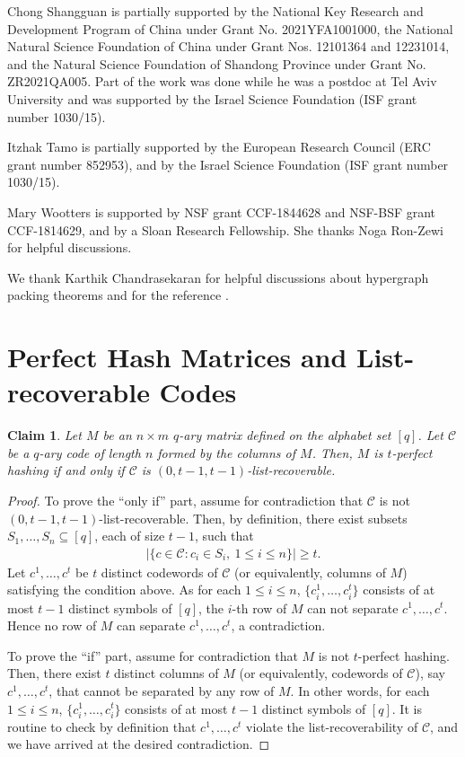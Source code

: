 \documentclass[11pt]{article}
\newtheorem{claim}[theorem]{Claim}
\newcommand\black[1]{{\color{black} #1}}
\newcommand{\ryl}[1]{{\color{red} {\small [Ray: #1]}}}
\begin{document}
Chong Shangguan is partially supported by the National Key Research and Development Program of China under Grant No. 2021YFA1001000,
the National Natural Science Foundation of China under Grant Nos. 12101364 and 12231014, and the Natural Science Foundation of Shandong Province under Grant
No. ZR2021QA005. Part of the work was done while he was a postdoc at Tel Aviv University and was supported by the Israel Science Foundation (ISF grant number 1030/15).

Itzhak Tamo is partially supported by the European Research Council (ERC grant number 852953), and by the Israel Science Foundation (ISF grant number 1030/15).

Mary Wootters is supported by NSF grant CCF-1844628 and  NSF-BSF grant CCF-1814629, and by a Sloan Research Fellowship.  She thanks Noga Ron-Zewi for helpful discussions.

We thank Karthik Chandrasekaran for helpful discussions about hypergraph packing theorems and for the reference \cite{CCV09}.



\newpage
\appendix

\black{\section{Perfect Hash Matrices and List-recoverable Codes}}

\black{\begin{claim}\label{app:matrices-codes}
    Let $M$ be an $n\times m$ $q$-ary matrix defined on the alphabet set $[q]$. Let $\mathcal{C}$ be a $q$-ary code of length $n$ formed by the columns of $M$. Then, $M$ is $t$-perfect hashing if and only if $\mathcal{C}$ is $(0,t-1,t-1)$-list-recoverable.
\end{claim}
\begin{proof}
    To prove the ``only if'' part, assume for contradiction that $\mathcal{C}$ is not $(0,t-1,t-1)$-list-recoverable. Then, by definition, there exist subsets $S_1,\ldots,S_n\subseteq [q]$, each of size $t-1$, such that
    \begin{align*}
        |\{c\in\mathcal{C}:c_i\in S_i,~1\le i\le n\}|\ge t.
    \end{align*}
    Let $c^1,\ldots,c^t$ be $t$ distinct codewords of $\mathcal{C}$ (or equivalently, columns of $M$) satisfying the condition above. As for each $1\le i\le n$, $\{c^1_i,\ldots,c^t_i\}$ consists of at most $t-1$ distinct symbols of $[q]$, the $i$-th row of $M$ can not separate $c^1,\ldots,c^t$. Hence no row of $M$ can separate $c^1,\ldots,c^t$, a contradiction.

    To prove the ``if'' part, assume for contradiction that $M$ is not $t$-perfect hashing. Then, there exist $t$ distinct columns of $M$ (or equivalently, codewords of $\mathcal{C}$), say $c^1,\ldots,c^t$, that cannot be separated by any row of $M$. In other words, for each $1\le i\le n$, $\{c^1_i,\ldots,c^t_i\}$ consists of at most $t-1$ distinct symbols of $[q]$. It is routine to check by definition that $c^1,\ldots,c^t$ violate the list-recoverability of $\mathcal{C}$, and we have arrived at the desired contradiction.
\end{proof}}
\end{document}
